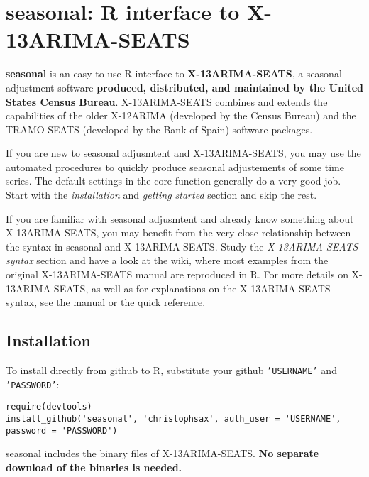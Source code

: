 \section{seasonal: R interface to
X-13ARIMA-SEATS}\label{seasonal-r-interface-to-x-13arima-seats}

\textbf{seasonal} is an easy-to-use R-interface to
\textbf{X-13ARIMA-SEATS}, a seasonal adjustment software
\textbf{produced, distributed, and maintained by the United States
Census Bureau}. X-13ARIMA-SEATS combines and extends the capabilities of
the older X-12ARIMA (developed by the Census Bureau) and the TRAMO-SEATS
(developed by the Bank of Spain) software packages.

If you are new to seasonal adjusmtent and X-13ARIMA-SEATS, you may use
the automated procedures to quickly produce seasonal adjustements of
some time series. The default settings in the core function generally do
a very good job. Start with the \emph{installation} and \emph{getting
started} section and skip the rest.

If you are familiar with seasonal adjusmtent and already know something
about X-13ARIMA-SEATS, you may benefit from the very close relationship
between the syntax in seasonal and X-13ARIMA-SEATS. Study the
\emph{X-13ARIMA-SEATS syntax} section and have a look at the
\href{https://github.com/christophsax/seasonal/wiki/Examples-of-X-13ARIMA-SEATS-in-R}{wiki},
where most examples from the original X-13ARIMA-SEATS manual are
reproduced in R. For more details on X-13ARIMA-SEATS, as well as for
explanations on the X-13ARIMA-SEATS syntax, see the
\href{http://www.census.gov/ts/x13as/docX13AS.pdf}{manual} or the
\href{http://www.census.gov/ts/x13as/pc/qrefX13ASpc.pdf}{quick
reference}.

\subsection{Installation}\label{installation}

To install directly from github to R, substitute your github
\texttt{'USERNAME'} and \texttt{'PASSWORD'}:

\begin{verbatim}
require(devtools)
install_github('seasonal', 'christophsax', auth_user = 'USERNAME', password = 'PASSWORD')
\end{verbatim}

seasonal includes the binary files of X-13ARIMA-SEATS. \textbf{No
separate download of the binaries is needed.}

